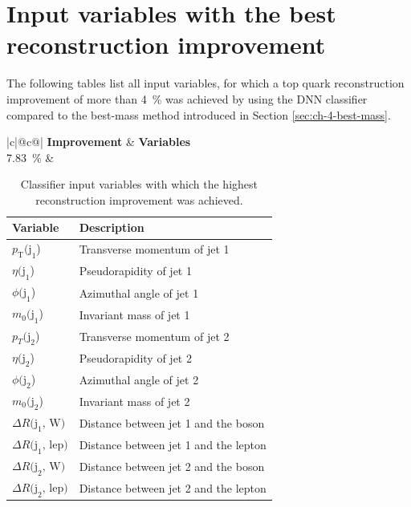 \chapter{Input variables with the best reconstruction improvement}
\label{ch:appendix_a}
The following tables list all input variables, for which a top quark reconstruction improvement of more than \SI{4}{\%} was achieved by using the DNN classifier compared to the best-mass method introduced in Section \ref{sec:ch-4-best-mass}.

\begin{table}[h]
    \centering
    \label{tab:app_vars_1}
    \caption{Classifier input variables with which the highest reconstruction improvement was achieved.}
    \begin{tabular}{ |c|@{}c@{}| }
        \hline
        \textbf{Improvement} & \textbf{Variables}\\
        \hline
        \SI{7.83}{\%} & 
        \begin{tabular}{ll}
            \hline
            Variable & Description\\
            \hline
            $p_\text{T}\text{(j}_\text{1}$) & Transverse momentum of jet 1\\
            $\eta\text{(j}_\text{1}$) & Pseudorapidity of jet 1\\
            $\phi\text{(j}_\text{1}$) & Azimuthal angle of jet 1\\
            $m_0\text{(j}_\text{1}$) & Invariant mass of jet 1\\

            $p_T\text{(j}_\text{2}$) & Transverse momentum of jet 2\\
            $\eta\text{(j}_\text{2}$) & Pseudorapidity of jet 2\\
            $\phi\text{(j}_\text{2}$) & Azimuthal angle of jet 2\\
            $m_0\text{(j}_\text{2}$) & Invariant mass of jet 2\\

            $\Delta R \text{(j}_\text{1}\text{, W)}$ & Distance between jet 1 and the \PW boson\\
            $\Delta R \text{(j}_\text{1}\text{, lep)}$ & Distance between jet 1 and the lepton\\
            $\Delta R \text{(j}_\text{2}\text{, W)}$ & Distance between jet 2 and the \PW boson\\
            $\Delta R \text{(j}_\text{2}\text{, lep)}$ & Distance between jet 2 and the lepton\\
            \hline
        \end{tabular}\\
        \hline
    \end{tabular}
\end{table}

